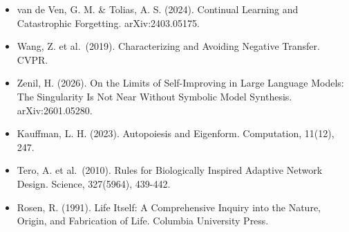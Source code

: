 \documentclass[
  11pt,
]{article}
\begin{document}
\begin{itemize}
  Strehl, A. L. \& Littman, M. L. (2008). An Analysis of Model-Based
  Interval Estimation for Markov Decision Processes. JCSS, 74(8),
  1309-1331.
\item
  van de Ven, G. M. \& Tolias, A. S. (2024). Continual Learning and
  Catastrophic Forgetting. arXiv:2403.05175.
\item
  Wang, Z. et al.~(2019). Characterizing and Avoiding Negative Transfer.
  CVPR.
\item
  Zenil, H. (2026). On the Limits of Self-Improving in Large Language
  Models: The Singularity Is Not Near Without Symbolic Model Synthesis.
  arXiv:2601.05280.
\item
  Kauffman, L. H. (2023). Autopoiesis and Eigenform. Computation,
  11(12), 247.
\item
  Tero, A. et al.~(2010). Rules for Biologically Inspired Adaptive
  Network Design. Science, 327(5964), 439-442.
\item
  Rosen, R. (1991). Life Itself: A Comprehensive Inquiry into the
  Nature, Origin, and Fabrication of Life. Columbia University Press.
\end{itemize}
\end{document}
